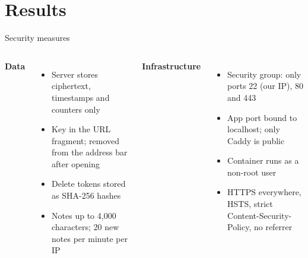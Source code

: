 \documentclass[aspectratio=169,11pt]{beamer}
\begin{document}
\section{Results}
\begin{frame}{Security measures}
  \begin{columns}[T]
    \textbf{Data}
    \begin{itemize}\small
      \item Server stores ciphertext, timestamps and counters only
      \item Key in the URL fragment; removed from the address bar after opening
      \item Delete tokens stored as SHA-256 hashes
      \item Notes up to 4,000 characters; 20 new notes per minute per IP
    \end{itemize}
    \textbf{Infrastructure}
    \begin{itemize}\small
      \item Security group: only ports 22 (our IP), 80 and 443
      \item App port bound to localhost; only Caddy is public
      \item Container runs as a non-root user
      \item HTTPS everywhere, HSTS, strict Content-Security-Policy, no referrer
    \end{itemize}
  \end{columns}
\end{frame}
\end{document}

